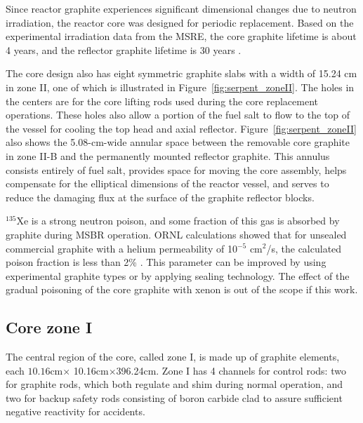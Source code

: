 Since reactor graphite experiences significant dimensional changes due to 
neutron irradiation, the reactor core was designed for periodic replacement. 
Based on the experimental irradiation data from the \gls{MSRE}, the core 
graphite lifetime is about 4 years, and the reflector graphite lifetime is 30 
years \cite{robertson_conceptual_1971}.

The core design also has eight symmetric graphite slabs with a width of 15.24 
cm in zone II, one of which is illustrated in Figure~\ref{fig:serpent_zoneII}. 
The holes in the centers are for the core lifting rods used during the core 
replacement operations. These holes also allow a portion of the fuel salt to 
flow to the top of the vessel for cooling the top head and axial reflector.  
Figure~\ref{fig:serpent_zoneII} also shows the 5.08-cm-wide annular 
space between the removable core graphite in zone II-B and the permanently 
mounted reflector graphite. This annulus consists entirely of fuel salt, 
provides space for moving the core assembly, helps compensate for the 
elliptical dimensions of the reactor vessel, and serves to reduce the damaging 
flux at the surface of the graphite reflector blocks. 

$^{135}$Xe is a strong neutron poison, and some fraction of this gas is  
absorbed by graphite during \gls{MSBR} operation. ORNL calculations showed 
that for unsealed commercial graphite with a helium permeability of 10$^{-5}$ 
cm$^2$/s, the calculated poison fraction is less than 2\% 
\cite{robertson_conceptual_1971}. This parameter can be improved by using 
experimental graphite types or by applying sealing technology. The effect of 
the gradual poisoning of the core graphite with xenon is out of the scope if 
this work.

\subsection{Core zone I}
The central region of the core, called zone I, is made up of graphite 
elements, each $10.16$cm$\times$ 10.16cm$\times$396.24cm. Zone I has 4 
channels for control rods: two for graphite rods, which both regulate and shim 
during normal operation, and two for backup safety rods consisting of boron 
carbide clad to assure sufficient negative reactivity for accidents.

